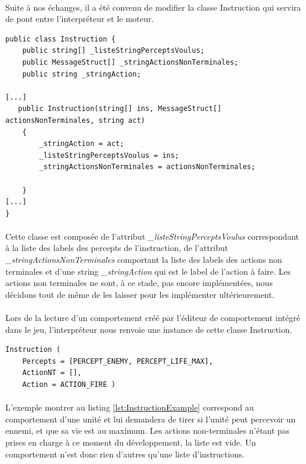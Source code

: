 \documentclass{report}
\begin{document}
\paragraph{}Suite à nos échanges, il a été convenu de modifier la classe Instruction qui servira de pont entre l’interpréteur et le moteur.

\begin{lstlisting}[language={[Sharp]C},label={lst:InstructionScript}, caption=  Extrait du code du script Instruction.cs]
public class Instruction {
    public string[] _listeStringPerceptsVoulus;
    public MessageStruct[] _stringActionsNonTerminales;
    public string _stringAction;
    
[...]
   public Instruction(string[] ins, MessageStruct[] actionsNonTerminales, string act)
    {
        _stringAction = act;
        _listeStringPerceptsVoulus = ins;
        _stringActionsNonTerminales = actionsNonTerminales;

    }
[...]
}
\end{lstlisting}
\paragraph{}Cette classe est composée de l'attribut \textit{\_listeStringPerceptsVoulus} correspondant à la liste des labels des percepts de l'instruction, de l'attribut \textit{\_stringActionsNonTerminales} comportant la liste des labels des actions non terminales et d'une string \textit{\_stringAction} qui est le label de l'action à faire. Les actions non terminales ne sont, à ce stade, pas encore implémentées, nous décidons tout de même de les laisser pour les implémenter ultérieurement.
\paragraph{}Lors de la lecture d'un comportement créé par l'éditeur de comportement intégré dans le jeu, l’interpréteur nous renvoie une instance de cette classe Instruction.

\begin{lstlisting}[label={lst:InstructionExample}, caption=  Exemple d'une instruction d'un comportement que peut renvoyer l’interpréteur.]
Instruction (
	Percepts = [PERCEPT_ENEMY, PERCEPT_LIFE_MAX],
	ActionNT = [],
	Action = ACTION_FIRE )
\end{lstlisting}

\paragraph{}L'exemple montrer au listing \ref{lst:InstructionExample} correspond au comportement d'une unité et lui demandera de tirer si l'unité peut percevoir un ennemi, et que sa vie est au maximum. Les actions non-terminales n'étant pas prises en charge à ce moment du développement, la liste est vide. Un comportement n'est donc rien d'autres qu'une liste d'instructions.
\end{document}

